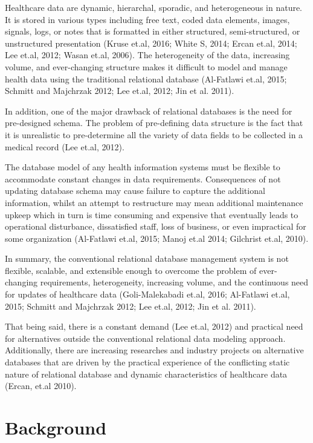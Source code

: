 \documentclass[review]{elsarticle}
\begin{document}
Healthcare data are dynamic, hierarchal, sporadic, and heterogeneous in nature. It is stored in various types including free text, coded data elements, images, signals, logs, or notes that is formatted in either structured, semi-structured, or unstructured presentation (Kruse et.al, 2016; White S, 2014; Ercan et.al, 2014; Lee et.al, 2012; Wasan et.al, 2006). The heterogeneity of the data, increasing volume, and ever-changing structure makes it difficult to model and manage health data using the traditional relational database (Al-Fatlawi et.al, 2015; Schmitt and Majchrzak 2012; Lee et.al, 2012; Jin et al. 2011).

In addition, one of the major drawback of relational databases is the need for pre-designed schema. The problem of pre-defining data structure is the fact that it is unrealistic to pre-determine all the variety of data fields to be collected in a medical record (Lee et.al, 2012). 

The database model of any health information systems must be flexible to accommodate constant changes in data requirements. Consequences of not updating database schema may cause failure to capture the additional information, whilst an attempt to restructure may mean additional maintenance upkeep which in turn is time consuming and expensive that eventually leads to operational disturbance, dissatisfied staff, loss of business, or even impractical for some organization (Al-Fatlawi et.al, 2015; Manoj et.al 2014; Gilchrist et.al, 2010). 

In summary, the conventional relational database management system is not flexible, scalable, and extensible enough to overcome the problem of ever-changing requirements, heterogeneity, increasing volume, and the continuous need for updates of healthcare data (Goli-Malekabadi et.al, 2016; Al-Fatlawi et.al, 2015; Schmitt and Majchrzak 2012; Lee et.al, 2012; Jin et al. 2011).

That being said, there is a constant demand (Lee et.al, 2012) and practical need for alternatives outside the conventional relational data modeling approach. Additionally, there are increasing researches and industry projects on alternative databases that are driven by the practical experience of the conflicting static nature of relational database and dynamic characteristics of healthcare data (Ercan, et.al 2010).

\section{Background}
\end{document}
